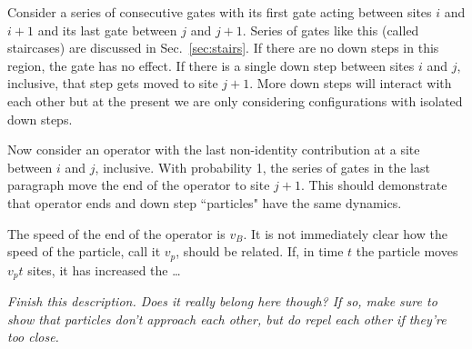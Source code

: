Consider a series of consecutive gates with its first gate acting between sites $i$ and $i+1$ and its last gate between $j$ and $j+1$. Series of gates like this (called staircases) are discussed in Sec.~\ref{sec:stairs}. If there are no down steps in this region, the gate has no effect. If there is a single down step between sites $i$ and $j$, inclusive, that step gets moved to site $j+1$. More down steps will interact with each other but at the present we are only considering configurations with isolated down steps. 

Now consider an operator with the last non-identity contribution at a site between $i$ and $j$, inclusive. With probability 1, the series of gates in the last paragraph move the end of the operator to site $j+1$. This should demonstrate that operator ends and down step ``particles" have the same dynamics. 

The speed of the end of the operator is $v_B$. It is not immediately clear how the speed of the particle, call it $v_p$, should be related. If, in time $t$ the particle moves $v_pt$ sites, it has increased the \dots

\emph{Finish this description. Does it really belong here though? If so, make sure to show that particles don't approach each other, but do repel each other if they're too close.}